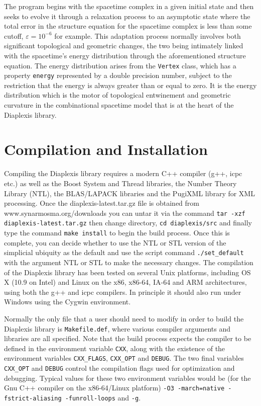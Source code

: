 \documentclass[12pt,letterpaper]{report}
\begin{document}
The program begins with the spacetime complex in a given initial state and then seeks to 
evolve it through a relaxation process to an asymptotic state where the total error in the 
structure equation for the spacetime complex is less than some cutoff, $\varepsilon = 10^{-6}$ 
for example. This adaptation process normally involves both significant topological and 
geometric changes, the two being intimately linked with the spacetime's energy distribution 
through the aforementioned structure equation. The energy distribution arises from the 
\texttt{Vertex} class, which has a property \texttt{energy} represented by a double precision 
number, subject to the restriction that the energy is always greater than or equal to zero. 
It is the energy distribution which is the motor of topological entwinement and geometric 
curvature in the combinational spacetime model that is at the heart of the Diaplexis library.  

\section{Compilation and Installation}

Compiling the Diaplexis library requires a modern C++ compiler (g++, icpc etc.) as well as 
the Boost System and Thread libraries, the Number Theory Library (NTL), the BLAS/LAPACK 
libraries and the PugiXML library for XML processing. Once the diaplexis-latest.tar.gz file is 
obtained from www.synarmosma.org/downloads you can untar it via the command\newline
\texttt{tar -xzf diaplexis-latest.tar.gz}\newline
then change directory,\newline
\texttt{cd diaplexis/src}\newline  
and finally type the command \texttt{make install} to begin the build process. Once this is 
complete, you can decide whether to use the NTL or STL version of the simplicial ubiquity 
as the default and use the script command \texttt{./set\_default} with the argument NTL or STL 
to make the necessary changes. The compilation of the Diaplexis library has been 
tested on several Unix platforms, including OS X (10.9 on Intel) and Linux on the x86, 
x86-64, IA-64 and ARM architectures, using both the g++ and icpc compilers. In principle it 
should also run under Windows using the Cygwin environment. 

Normally the only file that a user should need to modify in order to build the Diaplexis library 
is \texttt{Makefile.def}, where various compiler arguments and libraries are all specified. Note that 
the build process expects the compiler to be defined in the environment variable \texttt{CXX}, along 
with the existence of the environment variables \texttt{CXX\_FLAGS}, \texttt{CXX\_OPT} and \texttt{DEBUG}. 
The two final variables \texttt{CXX\_OPT} and \texttt{DEBUG} control the compilation flags used for 
optimization and debugging. Typical values for these two environment variables would be (for the Gnu 
C++ compiler on the x86-64/Linux platform) \texttt{-O3 -march=native -fstrict-aliasing -funroll-loops} 
and \texttt{-g}.
\end{document}
